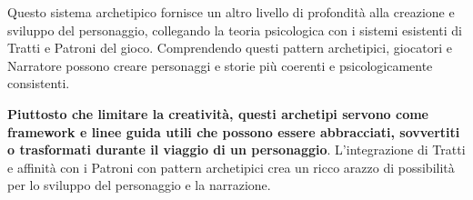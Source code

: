 \begin{multicols}{2}
\begin{changemargin}{0.3cm}{0.3cm}\begin{narratore}
Questo sistema archetipico fornisce un altro livello di profondità alla creazione e sviluppo del personaggio, collegando la teoria psicologica con i sistemi esistenti di Tratti e Patroni del gioco. Comprendendo questi pattern archetipici, giocatori e Narratore possono creare personaggi e storie più coerenti e psicologicamente consistenti.

\textbf{Piuttosto che limitare la creatività, questi archetipi servono come framework e linee guida utili che possono essere abbracciati, sovvertiti o trasformati durante il viaggio di un personaggio}. L'integrazione di Tratti e affinità con i Patroni con pattern archetipici crea un ricco arazzo di possibilità per lo sviluppo del personaggio e la narrazione.
\end{narratore}\end{changemargin}


\end{multicols}

\pagebreak


